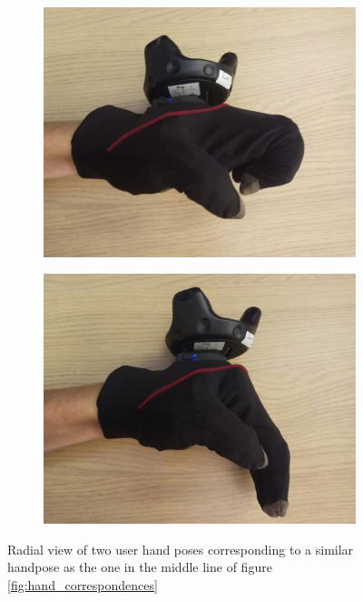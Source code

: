 \documentclass[hyperref, bachelorofscience]{cgvpub}
\begin{document}
\begin{figure}
	\centering
	\begin{subfigure}{.4\linewidth}
		\includegraphics[width=\linewidth]{../pics/hand_radial_natfake1}
	\end{subfigure}
	\hspace{1cm}
	\begin{subfigure}{.4\linewidth}
		\includegraphics[width=\linewidth]{../pics/hand_radial_natfake2}
	\end{subfigure}
	\caption{Radial view of two user hand poses corresponding to a similar handpose as the one in the middle line of figure \ref{fig:hand_correspondences}}
	\label{fig:natfake}
\end{figure}
\end{document}
